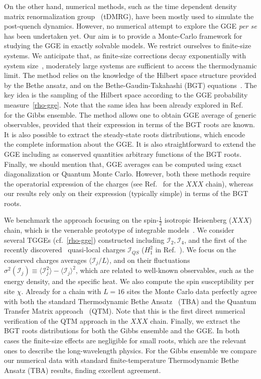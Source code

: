 \documentclass[twocolumn,superscriptaddress,prb,10pt]{revtex4-1}
\begin{document}
On the other hand, numerical methods, such as the time dependent density 
matrix renormalization group~\cite{white-2004,daley-2004} (tDMRG), have been mostly 
used to simulate the post-quench dynamics. However, no numerical 
attempt to explore the GGE {\it per se} has been undertaken yet. Our aim is to 
provide a Monte-Carlo framework for studying the GGE    
in exactly solvable models. We restrict ourselves to finite-size systems.  
We anticipate that, as finite-size corrections decay exponentially with system size~\cite{iyer-2015}, 
moderately large systems are sufficient to access the thermodynamic limit. 
The method relies on the knowledge of the Hilbert space structure provided by 
the Bethe ansatz, and on the Bethe-Gaudin-Takahashi (BGT) equations~\cite{takahashi-1971,
taka-book}. The key idea is the sampling of the Hilbert space according to 
the GGE probability measure~\eqref{rho-gge}. Note that the same 
idea has been already explored in Ref.~ for the Gibbs ensemble.
The method allows one to obtain GGE average of generic observables, provided  
that their expression in terms of the BGT roots are known. 
It is also possible to extract the steady-state roots distributions, which encode 
the complete information about the GGE. It is also straightforward to extend 
the GGE including as conserved quantities arbitrary functions of the BGT roots.
Finally, we should mention that, GGE averages can be computed 
using exact diagonalization or Quantum Monte Carlo. However, both these methods require 
the operatorial expression of the charges (see Ref.~ 
for the $XXX$ chain), whereas our results rely only on their expression (typically simple) 
in terms of the BGT roots. 

We benchmark the approach focusing on the spin-$\frac{1}{2}$ isotropic 
Heisenberg ($XXX$) chain, which is the venerable prototype of integrable 
models~\cite{bethe-1931}. We consider several TGGEs 
(cf.~\eqref{rho-gge}) constructed including ${\mathcal I}_2,{\mathcal I}_4$, and the 
first of the recently discovered~\cite{ilievski-2015,ilievski-2015a} 
quasi-local charges ${\mathcal I}_{QS}$ ($H_1^2$ in Ref.~). 
We focus on the conserved charges averages $\langle{\mathcal I}_j/L\rangle$, 
and on their fluctuations $\sigma^2({\mathcal I}_j)\equiv\langle{\mathcal I}_j^2
\rangle-\langle{\mathcal I}_j\rangle^2$, which  are related to well-known  
observables, such as the energy density, and the specific heat. We also compute the spin susceptibility 
per site $\chi$. Already for a chain with $L=16$ sites the Monte Carlo data perfectly agree 
with both the standard Thermodynamic Bethe Ansatz~\cite{mossel-2012} (TBA) and the Quantum Transfer 
Matrix approach~\cite{fagotti-2013a,pozsgay-2013} (QTM). Note that this is the first direct 
numerical verification of the QTM approach in the $XXX$ chain. 
Finally, we extract the BGT roots distributions for both the Gibbs ensemble and the GGE. 
In both cases the finite-size effects are negligible for small roots, which are the 
relevant ones to describe the long-wavelength physics. For the Gibbs ensemble we compare 
our numerical data with standard finite-temperature Thermodynamic Bethe Ansatz (TBA) results, 
finding excellent agreement. 
\end{document}
